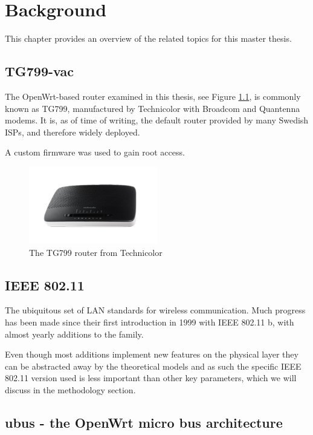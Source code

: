 
\chapter{Background}

This chapter provides an overview of the related topics for this master thesis.

\section{TG799-vac}

The OpenWrt-based router examined in this thesis, see Figure \ref{fig:tg799}, is
commonly known as TG799, manufactured by Technicolor with Broadcom and Quantenna
modems. It is, as of time of writing, the default router provided by many
Swedish ISPs, and therefore widely deployed.

A custom firmware was used to gain root access.

\begin{figure}
\center
\includegraphics[width=0.5\textwidth]{images/tg799.png}
\caption{The TG799 router from Technicolor}
\label{fig:tg799}
\end{figure}

\section{IEEE 802.11}

The ubiquitous set of LAN standards for wireless communication. Much progress
has been made since their first introduction in 1999 with IEEE 802.11 b, with
almost yearly additions to the family.

Even though most additions implement new features on the physical layer they can
be abstracted away by the theoretical models and as such the specific IEEE
802.11 version used is less important than other key parameters, which we will
discuss in the methodology section.

\section{ubus - the OpenWrt micro bus architecture}

